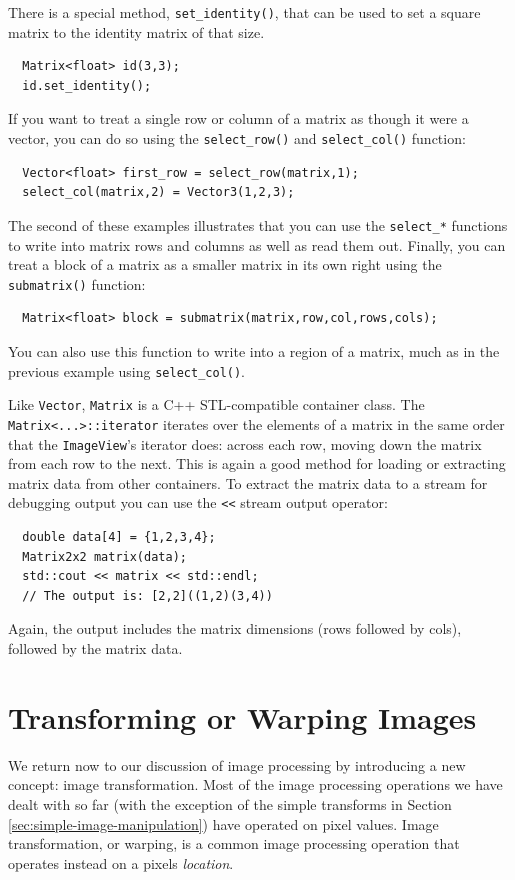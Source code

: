 There is a special method, \verb#set_identity()#, that can be used 
to set a square matrix to the identity matrix of that size.
\begin{verbatim}
  Matrix<float> id(3,3);
  id.set_identity();
\end{verbatim}
If you want to treat a single row or column of a matrix as though 
it were a vector, you can do so using the \verb#select_row()# and 
\verb#select_col()# function:
\begin{verbatim}
  Vector<float> first_row = select_row(matrix,1);
  select_col(matrix,2) = Vector3(1,2,3);
\end{verbatim}
The second of these examples illustrates that you can use the 
\verb#select_*# functions to write into matrix rows and 
columns as well as read them out.  Finally, you can treat 
a block of a matrix as a smaller matrix in its own right 
using the \verb#submatrix()# function:
\begin{verbatim}
  Matrix<float> block = submatrix(matrix,row,col,rows,cols);
\end{verbatim}
You can also use this function to write into a region of a 
matrix, much as in the previous example using \verb#select_col()#.

Like \verb#Vector#, \verb#Matrix# is a C++ STL-compatible 
container class.  The \verb#Matrix<...>::iterator# iterates 
over the elements of a matrix in the same order that the 
\verb#ImageView#'s iterator does: across each row, moving 
down the matrix from each row to the next.  This is again a 
good method for loading or extracting matrix data from other 
containers.  To extract the matrix data to a stream for 
debugging output you can use the \verb#<<# stream output 
operator:
\begin{verbatim}
  double data[4] = {1,2,3,4};
  Matrix2x2 matrix(data);
  std::cout << matrix << std::endl;
  // The output is: [2,2]((1,2)(3,4))
\end{verbatim}
Again, the output includes the matrix dimensions (rows 
followed by cols), followed by the matrix data.

\section{Transforming or Warping Images}

We return now to our discussion of image processing by introducing a
new concept: image transformation.  Most of the image processing
operations we have dealt with so far (with the exception of the simple
transforms in Section \ref {sec:simple-image-manipulation}) have
operated on pixel values.  Image transformation, or warping, is a
common image processing operation that operates instead on a pixels
{\em location}.

